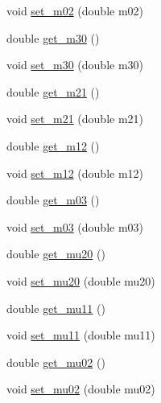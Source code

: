 \begin{DoxyCompactItemize}
\item 
void \mbox{\hyperlink{classorg_1_1opencv_1_1imgproc_1_1_moments_ad24443b3cc080c3d556ee93f5fb9c01a}{set\+\_\+m02}} (double m02)
\item 
double \mbox{\hyperlink{classorg_1_1opencv_1_1imgproc_1_1_moments_a935567052f5e7f8d6040d88c8f81f00f}{get\+\_\+m30}} ()
\item 
void \mbox{\hyperlink{classorg_1_1opencv_1_1imgproc_1_1_moments_aae5794837e7bc2a5f90f482e568349ad}{set\+\_\+m30}} (double m30)
\item 
double \mbox{\hyperlink{classorg_1_1opencv_1_1imgproc_1_1_moments_a960e6ce8f7e903ad03804210a52c28a6}{get\+\_\+m21}} ()
\item 
void \mbox{\hyperlink{classorg_1_1opencv_1_1imgproc_1_1_moments_aa799aa9aae1c22404a39ce4de7393a56}{set\+\_\+m21}} (double m21)
\item 
double \mbox{\hyperlink{classorg_1_1opencv_1_1imgproc_1_1_moments_ab894160dc797289318505970a9c766f9}{get\+\_\+m12}} ()
\item 
void \mbox{\hyperlink{classorg_1_1opencv_1_1imgproc_1_1_moments_ae26e466d107fdc21cd08ad7b64ea4be8}{set\+\_\+m12}} (double m12)
\item 
double \mbox{\hyperlink{classorg_1_1opencv_1_1imgproc_1_1_moments_ab9dd000a34579ceaa1c5ae9f3be11ec1}{get\+\_\+m03}} ()
\item 
void \mbox{\hyperlink{classorg_1_1opencv_1_1imgproc_1_1_moments_a9889d63301231af18f0bf3bb1f1ee127}{set\+\_\+m03}} (double m03)
\item 
double \mbox{\hyperlink{classorg_1_1opencv_1_1imgproc_1_1_moments_acd7b48ebcfd58772c40d2efdc74fccec}{get\+\_\+mu20}} ()
\item 
void \mbox{\hyperlink{classorg_1_1opencv_1_1imgproc_1_1_moments_a053cfb8bf619de8c9c885a625e3434cf}{set\+\_\+mu20}} (double mu20)
\item 
double \mbox{\hyperlink{classorg_1_1opencv_1_1imgproc_1_1_moments_a3110e40258b4ddaaba2ffe6db94d4009}{get\+\_\+mu11}} ()
\item 
void \mbox{\hyperlink{classorg_1_1opencv_1_1imgproc_1_1_moments_ad1824bdf0c1153ae987b6aa2c2c7b8e8}{set\+\_\+mu11}} (double mu11)
\item 
double \mbox{\hyperlink{classorg_1_1opencv_1_1imgproc_1_1_moments_a9a9a7bd6e0556bdf607c770834cc47b4}{get\+\_\+mu02}} ()
\item 
void \mbox{\hyperlink{classorg_1_1opencv_1_1imgproc_1_1_moments_a2c13762c0fe32f26bfdad7910d8e25ab}{set\+\_\+mu02}} (double mu02)
\item 

\end{DoxyCompactItemize}
